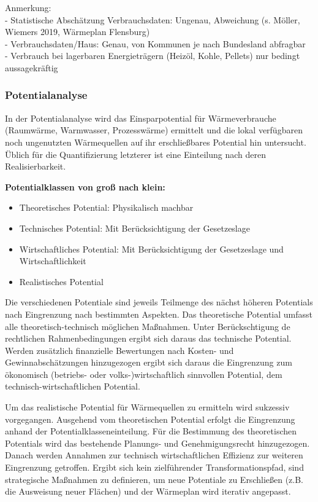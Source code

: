 				Anmerkung:\\
				- Statistische Abschätzung Verbrauchsdaten: Ungenau, Abweichung (s. Möller, Wiemers 2019, Wärmeplan Flensburg)\\
				- Verbrauchsdaten/Haus: Genau, von Kommunen je nach Bundesland abfragbar\\
				- Verbrauch bei lagerbaren Energieträgern (Heizöl, Kohle, Pellets) nur bedingt aussagekräftig\\
				
			\subsubsection{Potentialanalyse}
				
				In der Potentialanalyse wird das Einsparpotential für Wärmeverbrauche (Raumwärme, Warmwasser, Prozesswärme) ermittelt und die lokal verfügbaren noch ungenutzten Wärmequellen auf ihr erschließbares Potential hin untersucht. Üblich für die Quantifizierung letzterer ist eine Einteilung nach deren Realisierbarkeit. 
				
				\textbf{Potentialklassen von groß nach klein:}
				\begin{itemize}
					\item{Theoretisches Potential: Physikalisch machbar}
					\item{Technisches Potential: Mit Berücksichtigung der Gesetzeslage}  
					\item{Wirtschaftliches Potential: Mit Berücksichtigung der Gesetzeslage und Wirtschaftlichkeit}
					\item{Realistisches Potential}
				\end{itemize}
				
				Die verschiedenen Potentiale sind jeweils Teilmenge des nächst höheren Potentials nach Eingrenzung nach bestimmten Aspekten. Das theoretische Potential umfasst alle theoretisch-technisch möglichen Maßnahmen. Unter Berückschtigung de rechtlichen Rahmenbedingungen ergibt sich daraus das technische Potential. Werden zusätzlich finanzielle Bewertungen nach Kosten- und Gewinnabschätzungen hinzugezogen ergibt sich daraus die Eingrenzung zum ökonomisch (betriebs- oder volks-)wirtschaftlich sinnvollen Potential, dem technisch-wirtschaftlichen Potential. 
				
				Um das realistische Potential für Wärmequellen zu ermitteln wird sukzessiv vorgegangen. Ausgehend vom theoretischen Potential erfolgt die Eingrenzung anhand der Potentialklasseneinteilung. Für die Bestimmung des theoretischen Potentials wird das bestehende Planungs- und Genehmigungsrecht hinzugezogen. Danach werden Annahmen zur technisch wirtschaftlichen Effizienz zur weiteren Eingrenzung getroffen. Ergibt sich kein zielführender Transformationspfad, sind strategische Maßnahmen zu definieren, um neue Potentiale zu Erschließen (z.B. die Ausweisung neuer Flächen) und der Wärmeplan wird iterativ angepasst.
								
